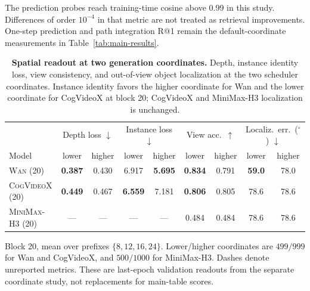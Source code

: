 \documentclass{article} %
\newcommand{\best}[1]{\cellcolor{morandibest}\textbf{#1}}
\newcommand{\model}[1]{\textsc{#1}}
\begin{document}
The prediction probes reach training-time cosine above 0.99 in this
study. Differences of order $10^{-4}$ in that metric are not treated as
retrieval improvements. One-step prediction and path integration R@1
remain the default-coordinate measurements in
Table~\ref{tab:main-results}.

\begin{table}[tbp]
  \centering
  \small
  \setlength{\tabcolsep}{3pt}
  \begin{tabular}{@{}lcccccccc@{}}
    \toprule
    & \multicolumn{2}{c}{Depth loss $\downarrow$}
    & \multicolumn{2}{c}{Instance loss $\downarrow$}
    & \multicolumn{2}{c}{View acc.\ $\uparrow$}
    & \multicolumn{2}{c}{Localiz.\ err.\ ($^\circ$) $\downarrow$} \\
    \cmidrule(lr){2-3}\cmidrule(lr){4-5}\cmidrule(lr){6-7}\cmidrule(lr){8-9}
    Model & lower & higher & lower & higher & lower & higher & lower & higher \\
    \midrule
    \model{Wan} (20)
      & \best{0.387} & 0.430
      & 6.917 & \best{5.695}
      & \best{0.834} & 0.791
      & \best{59.0} & 78.0 \\
    \model{CogVideoX} (20)
      & \best{0.449} & 0.467
      & \best{6.559} & 7.181
      & \best{0.806} & 0.805
      & 78.6 & 78.6 \\
    \model{MiniMax-H3} (20)
      & --- & ---
      & --- & ---
      & 0.484 & 0.484
      & 78.6 & 78.6 \\
    \bottomrule
  \end{tabular}
  \par\vspace{3pt}
  \begin{minipage}{0.98\linewidth}
  \footnotesize
  Block 20, mean over prefixes $\{8,12,16,24\}$.
  Lower/higher coordinates are $499/999$ for Wan and CogVideoX,
  and $500/1000$ for MiniMax-H3. Dashes denote unreported metrics. These are last-epoch validation readouts from
  the separate coordinate study, not replacements for main-table scores.
  \end{minipage}
  \caption{\textbf{Spatial readout at two generation coordinates.}
  Depth, instance identity loss, view consistency, and out-of-view object
  localization at the two scheduler coordinates. Instance identity
  favors the higher coordinate for Wan and the lower coordinate for
  CogVideoX at block 20; CogVideoX and MiniMax-H3 localization is unchanged.}
  \label{tab:timestep-early-late}
\end{table}
\end{document}
